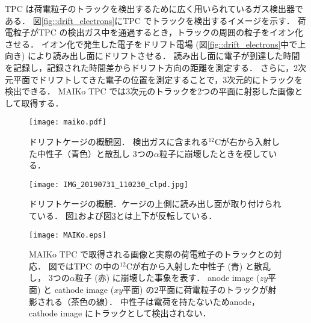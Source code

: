 \documentclass[../master]{subfiles}
\begin{document}
TPC は荷電粒子のトラックを検出するために広く用いられているガス検出器である．
図\ref{fig::drift_electrons}にTPC でトラックを検出するイメージを示す．
荷電粒子がTPC の検出ガス中を通過するとき，トラックの周囲の粒子をイオン化させる．
イオン化で発生した電子をドリフト電場 (図\ref{fig::drift_electrons}中で上向き) により読み出し面にドリフトさせる．
読み出し面に電子が到達した時間を記録し，記録された時間差からドリフト方向の距離を測定する．
さらに，2次元平面でドリフトしてきた電子の位置を測定することで，3次元的にトラックを検出できる．
MAIKo TPC では3次元のトラックを2つの平面に射影した画像として取得する．
%
\begin{figure}
  \centering
  \texttt{[image: maiko.pdf]}
  \caption{ドリフトケージの概観図．
    検出ガスに含まれる${}^{12}\mathrm{C}$が右から入射した中性子（青色）と散乱し
    3つの$\alpha$粒子に崩壊したときを模している．}
  \label{fig::maiko_cage}
\end{figure}
\begin{figure}
  \centering
  \texttt{[image: IMG\_20190731\_110230\_clpd.jpg]}
  \caption[ドリフトケージの概観．]
          {ドリフトケージの概観．ケージの上側に読み出し面が取り付けられている．
          図\ref{fig::maiko_cage}および図\ref{fig::MAIKo_view}とは上下が反転している．}
  \label{pic::MAIKo_cage}
\end{figure}
\begin{figure}
  \centering
  \texttt{[image: MAIKo.eps]}
  \caption{MAIKo TPC で取得される画像と実際の荷電粒子のトラックとの対応．
    図ではTPC の中の${}^{12}\mathrm{C}$が右から入射した中性子 (青) と散乱し，
    3つの$\alpha$粒子 (赤) に崩壊した事象を表す．
    anode image ($zy$平面) と cathode image ($xy$平面) の2平面に荷電粒子のトラックが射影される（茶色の線）．
    中性子は電荷を持たないためanode，cathode image にトラックとして検出されない．
  }
  \label{fig::MAIKo_view}
\end{figure}
\end{document}
